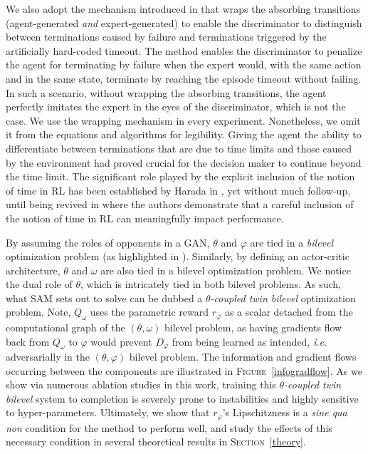 We also adopt the mechanism introduced in \cite{Kostrikov2019-jo}
that wraps the absorbing transitions
(agent-generated \emph{and} expert-generated)
to enable the discriminator to distinguish between
terminations caused by failure
and terminations triggered by the artificially hard-coded timeout.
The method enables the discriminator to penalize the agent for terminating by failure
when the expert would, with the same action and in the same state, terminate by
reaching the episode timeout without failing.
In such a scenario,
without wrapping the absorbing transitions, the agent perfectly imitates the expert in the
eyes of the discriminator, which is not the case.
We use the wrapping mechanism in every experiment.
Nonetheless, we omit it from the equations and algorithms for legibility.
Giving the agent the ability to differentiate between terminations that are due to time limits
and those caused by the environment had proved crucial
for the decision maker to continue beyond the time limit.
The significant role played by the explicit inclusion of the notion of time in RL
has been established by Harada in \cite{Harada1997-id}, yet without much follow-up,
until being revived in \cite{Pardo2018-xi} where the authors demonstrate that
a careful inclusion of the notion of time in RL can meaningfully impact performance.

By assuming the roles of opponents in a GAN,
$\theta$ and $\varphi$ are tied in a \emph{bilevel} optimization problem
(as highlighted in \cite{Pfau2016-ft}).
Similarly, by defining an actor-critic architecture,
$\theta$ and $\omega$ are also tied in a bilevel optimization problem.
We notice the dual role of $\theta$, which is intricately tied in both bilevel problems.
As such, what SAM \cite{Blonde2019-vc} sets out to solve
can be dubbed a \emph{$\theta$-coupled twin bilevel}
optimization problem.
Note, $Q_\omega$ uses the parametric reward $r_\varphi$ as a scalar detached from the
computational graph of the $(\theta, \omega)$ bilevel problem,
as having gradients flow back from $Q_\omega$ to $\varphi$ would
prevent $D_\varphi$ from being learned as intended,
\textit{i.e.} adversarially in the $(\theta, \varphi)$ bilevel problem.
The information and gradient flows occurring between the components are
illustrated in \textsc{Figure}~\ref{infogradflow}.
As we show via numerous ablation studies in this work,
training this \emph{$\theta$-coupled twin bilevel} system to completion
is severely prone to instabilities and highly sensitive to hyper-parameters.
Ultimately, we show that $r_\varphi$'s Lipschitzness is a \textit{sine qua non} condition
for the method to perform well, and study the effects of
this necessary condition in several theoretical results
in \textsc{Section}~\ref{theory}.

